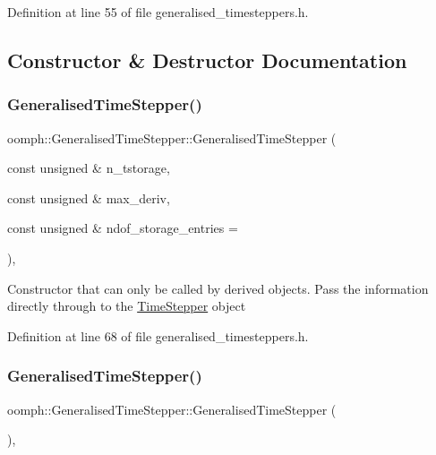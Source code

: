 Definition at line 55 of file generalised\+\_\+timesteppers.\+h.



\subsection{Constructor \& Destructor Documentation}
\mbox{\label{classoomph_1_1GeneralisedTimeStepper_a900fa5bbfd48ee5a133ed8c6c2ba44a8}} 
\subsubsection{\texorpdfstring{Generalised\+Time\+Stepper()}{GeneralisedTimeStepper()}\hspace{0.1cm}{\footnotesize\ttfamily [1/3]}}
{\footnotesize\ttfamily oomph\+::\+Generalised\+Time\+Stepper\+::\+Generalised\+Time\+Stepper (\begin{DoxyParamCaption}\item[{const unsigned \&}]{n\+\_\+tstorage,  }\item[{const unsigned \&}]{max\+\_\+deriv,  }\item[{const unsigned \&}]{ndof\+\_\+storage\+\_\+entries = {} }\end{DoxyParamCaption})\hspace{0.3cm}{\ttfamily [inline]}, {\ttfamily [protected]}}

Constructor that can only be called by derived objects. Pass the information directly through to the \hyperlink{classoomph_1_1TimeStepper}{Time\+Stepper} object 

Definition at line 68 of file generalised\+\_\+timesteppers.\+h.

\mbox{\label{classoomph_1_1GeneralisedTimeStepper_a8a200841329ed3abbf45ebe051598967}} 
\subsubsection{\texorpdfstring{Generalised\+Time\+Stepper()}{GeneralisedTimeStepper()}\hspace{0.1cm}{\footnotesize\ttfamily [2/3]}}
{\footnotesize\ttfamily oomph\+::\+Generalised\+Time\+Stepper\+::\+Generalised\+Time\+Stepper (\begin{DoxyParamCaption}{ }\end{DoxyParamCaption})\hspace{0.3cm}{\ttfamily [inline]}, {\ttfamily [protected]}}



